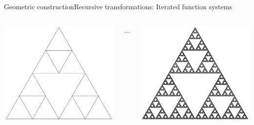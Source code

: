 \documentclass[xcolor=x11names,compress,professionalfonts]{beamer}
\renewcommand{\(}{\begin{columns}}
\renewcommand{\)}{\end{columns}}
\newcommand{\<}[1]{\begin{column}{#1}}
\renewcommand{\>}{\end{column}}
\begin{document}
\begin{frame}{Geometric construction}{Recursive transformations: Iterated function systems}
\begin{columns}
  \begin{column}{3cm}
    \includegraphics[scale=\s]{sierpinski2.pdf}
  \end{column}
  ...
    \begin{column}{3cm}
    \includegraphics[scale=\s]{sierpinskiInfty.pdf}
  \end{column}
\end{columns}

~


\end{frame}
\end{document}
